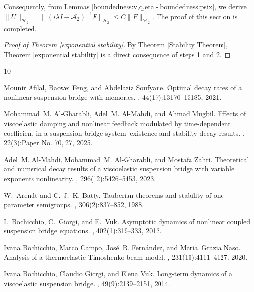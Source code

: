 \documentclass[11pt,reqno]{article}
\begin{document}
Consequently, from Lemmas \ref{boundedness:v,q,eta}-\ref{boundedness:psix}, we derive $\|U\|_{\mathcal{H}_2}=\|(i\lambda I-\mathcal{A}_2)^{-1}F\|_{\mathcal{H}_2} \leq C\|F\|_{\mathcal{H}_2}$. The proof of this section is completed.

\begin{proof}[Proof of Theorem \ref{exponential stability}]
	By Theorem \ref{Stability Theorem}, Theorem \ref{exponential stability} is a direct consequence of steps 1 and 2.
\end{proof}

%
%
\begin{thebibliography}{10}

Mounir Afilal, Baowei Feng, and Abdelaziz Soufyane.
\newblock Optimal decay rates of a nonlinear suspension bridge with memories.
, 44(17):13170--13185, 2021.

Mohammad~M. Al-Gharabli, Adel~M. Al-Mahdi, and Ahmad Mugbil.
\newblock Effects of viscoelastic damping and nonlinear feedback modulated by
  time-dependent coefficient in a suspension bridge system: existence and
  stability decay results.
, 22(3):Paper No. 70, 27, 2025.

Adel~M. Al-Mahdi, Mohammad~M. Al-Gharabli, and Mostafa Zahri.
\newblock Theoretical and numerical decay results of a viscoelastic suspension
  bridge with variable exponents nonlinearity.
, 296(12):5426--5453, 2023.

W.~Arendt and C.~J.~K. Batty.
\newblock Tauberian theorems and stability of one-parameter semigroups.
, 306(2):837--852, 1988.

I.~Bochicchio, C.~Giorgi, and E.~Vuk.
\newblock Asymptotic dynamics of nonlinear coupled suspension bridge equations.
, 402(1):319--333, 2013.

Ivana Bochicchio, Marco Campo, Jos\'e{}~R. Fern\'andez, and Maria~Grazia Naso.
\newblock Analysis of a thermoelastic {T}imoshenko beam model.
, 231(10):4111--4127, 2020.

Ivana Bochicchio, Claudio Giorgi, and Elena Vuk.
\newblock Long-term dynamics of a viscoelastic suspension bridge.
, 49(9):2139--2151, 2014.


\end{thebibliography}
\end{document}
